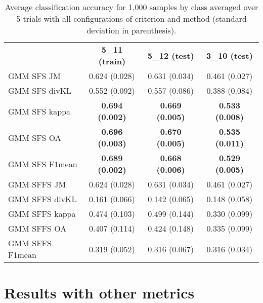 \documentclass[journal,10pt,onecolumn]{IEEEtran}
\begin{document}
    \begin{table}[H]
        \centering
        \caption{Average classification accuracy for 1,000 samples by class averaged over 5 trials  with all configurations of criterion and method (standard deviation in parenthesis).\label{tab:potsdam-otbsimu-all}}
        \begin{tabular}{lccc}\toprule
            & {\bfseries 5\_11 (train)} & {\bfseries 5\_12 (test)} & {\bfseries 3\_10 (test)} \\ \cmidrule{2-4}
            GMM SFS JM &      0.624 (0.028) & 0.631 (0.034) & 0.461 (0.027) \\
            GMM SFS divKL &   0.552 (0.092) & 0.557 (0.086) & 0.388 (0.084) \\
            GMM SFS kappa &   {\bfseries 0.694 (0.002)} & {\bfseries 0.669 (0.005)} & {\bfseries 0.533 (0.008)} \\
            GMM SFS OA &      {\bfseries 0.696 (0.003)} & {\bfseries 0.670 (0.005)} & {\bfseries 0.535 (0.011)} \\
            GMM SFS F1mean &  {\bfseries 0.689 (0.002)} & {\bfseries 0.668 (0.006)} & {\bfseries 0.529 (0.005)} \\
            GMM SFFS JM &     0.624 (0.028) & 0.631 (0.034) & 0.461 (0.027) \\
            GMM SFFS divKL &  0.161 (0.066) & 0.142 (0.065) & 0.148 (0.058) \\
            GMM SFFS kappa &  0.474 (0.103) & 0.499 (0.144) & 0.330 (0.099) \\
            GMM SFFS OA &     0.407 (0.114) & 0.424 (0.148) & 0.335 (0.099) \\
            GMM SFFS F1mean & 0.319 (0.052) & 0.316 (0.067) & 0.316 (0.034) \\
            \bottomrule
        \end{tabular}
    \end{table}

\section{Results with other metrics}
\label{sec:res-all-metrics}
\end{document}
